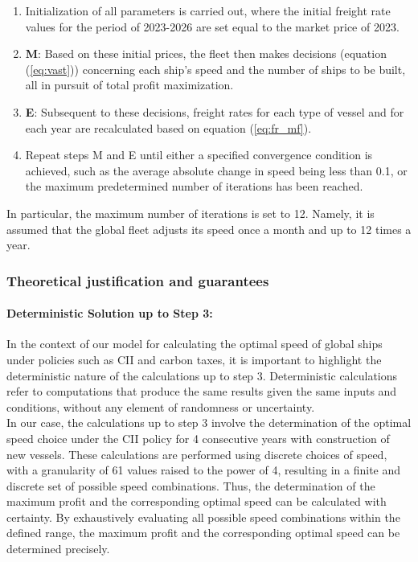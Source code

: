 \documentclass[a4paper,12pt]{article}
\begin{document}
\begin{enumerate}
	\item Initialization of all parameters is carried out, where the initial freight rate values for the period of 2023-2026 are set equal to the market price of 2023.
	\item \textbf{M}: Based on these initial prices, the fleet then makes decisions (equation (\ref{eq:vast})) concerning each ship's speed and the number of ships to be built, all in pursuit of total profit maximization.
	\item \textbf{E}: Subsequent to these decisions, freight rates for each type of vessel and for each year are recalculated based on equation (\ref{eq:fr_mf}).
	\item Repeat steps M and E until either a specified convergence condition is achieved, such as the average absolute change in speed being less than 0.1, or the maximum predetermined number of iterations has been reached.\\
\end{enumerate}

In particular, the maximum number of iterations is set to 12. 
Namely, it is assumed that the global fleet adjusts its speed once a month and up to 12 times a year.

\subsubsection{Theoretical justification and guarantees}

\paragraph{Deterministic Solution up to Step 3:}

In the context of our model for calculating the optimal speed of global ships under policies such as CII and carbon taxes, it is important to highlight the deterministic nature of the calculations up to step 3.
Deterministic calculations refer to computations that produce the same results given the same inputs and conditions, without any element of randomness or uncertainty.\\

In our case, the calculations up to step 3 involve the determination of the optimal speed choice under the CII policy for 4 consecutive years with construction of new vessels.
These calculations are performed using discrete choices of speed, with a granularity of 61 values raised to the power of 4, resulting in a finite and discrete set of possible speed combinations.
Thus, the determination of the maximum profit and the corresponding optimal speed can be calculated with certainty.
By exhaustively evaluating all possible speed combinations within the defined range, the maximum profit and the corresponding optimal speed can be determined precisely.\\
\end{document}

